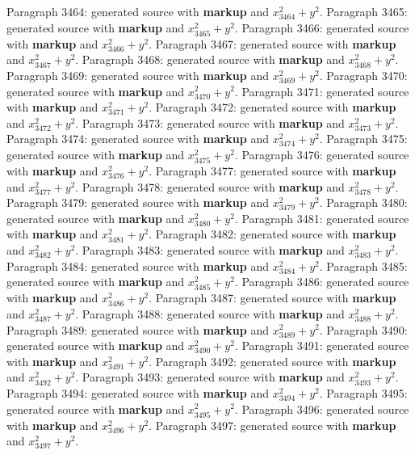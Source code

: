 \documentclass{article}
\begin{document}
Paragraph 3464: generated source with \textbf{markup} and $x_{3464}^2 + y^2$.
Paragraph 3465: generated source with \textbf{markup} and $x_{3465}^2 + y^2$.
Paragraph 3466: generated source with \textbf{markup} and $x_{3466}^2 + y^2$.
Paragraph 3467: generated source with \textbf{markup} and $x_{3467}^2 + y^2$.
Paragraph 3468: generated source with \textbf{markup} and $x_{3468}^2 + y^2$.
Paragraph 3469: generated source with \textbf{markup} and $x_{3469}^2 + y^2$.
Paragraph 3470: generated source with \textbf{markup} and $x_{3470}^2 + y^2$.
Paragraph 3471: generated source with \textbf{markup} and $x_{3471}^2 + y^2$.
Paragraph 3472: generated source with \textbf{markup} and $x_{3472}^2 + y^2$.
Paragraph 3473: generated source with \textbf{markup} and $x_{3473}^2 + y^2$.
Paragraph 3474: generated source with \textbf{markup} and $x_{3474}^2 + y^2$.
Paragraph 3475: generated source with \textbf{markup} and $x_{3475}^2 + y^2$.
Paragraph 3476: generated source with \textbf{markup} and $x_{3476}^2 + y^2$.
Paragraph 3477: generated source with \textbf{markup} and $x_{3477}^2 + y^2$.
Paragraph 3478: generated source with \textbf{markup} and $x_{3478}^2 + y^2$.
Paragraph 3479: generated source with \textbf{markup} and $x_{3479}^2 + y^2$.
Paragraph 3480: generated source with \textbf{markup} and $x_{3480}^2 + y^2$.
Paragraph 3481: generated source with \textbf{markup} and $x_{3481}^2 + y^2$.
Paragraph 3482: generated source with \textbf{markup} and $x_{3482}^2 + y^2$.
Paragraph 3483: generated source with \textbf{markup} and $x_{3483}^2 + y^2$.
Paragraph 3484: generated source with \textbf{markup} and $x_{3484}^2 + y^2$.
Paragraph 3485: generated source with \textbf{markup} and $x_{3485}^2 + y^2$.
Paragraph 3486: generated source with \textbf{markup} and $x_{3486}^2 + y^2$.
Paragraph 3487: generated source with \textbf{markup} and $x_{3487}^2 + y^2$.
Paragraph 3488: generated source with \textbf{markup} and $x_{3488}^2 + y^2$.
Paragraph 3489: generated source with \textbf{markup} and $x_{3489}^2 + y^2$.
Paragraph 3490: generated source with \textbf{markup} and $x_{3490}^2 + y^2$.
Paragraph 3491: generated source with \textbf{markup} and $x_{3491}^2 + y^2$.
Paragraph 3492: generated source with \textbf{markup} and $x_{3492}^2 + y^2$.
Paragraph 3493: generated source with \textbf{markup} and $x_{3493}^2 + y^2$.
Paragraph 3494: generated source with \textbf{markup} and $x_{3494}^2 + y^2$.
Paragraph 3495: generated source with \textbf{markup} and $x_{3495}^2 + y^2$.
Paragraph 3496: generated source with \textbf{markup} and $x_{3496}^2 + y^2$.
Paragraph 3497: generated source with \textbf{markup} and $x_{3497}^2 + y^2$.
\end{document}
